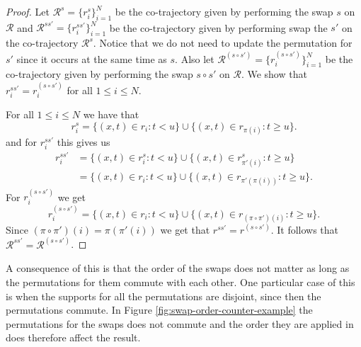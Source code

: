 \documentclass[12pt]{article}
\newcommand{\traj}{r}
\newcommand{\cotraj}{\mathcal{R}}
\newcommand{\swap}{s}
\theoremstyle{definition}
\begin{document}
\begin{proof}
  Let \(\cotraj^{\swap} = \{\traj^{\swap}_{i}\}_{i = 1}^{N}\) be the
  co-trajectory given by performing the swap \(\swap\) on \(\cotraj\)
  and
  \(\cotraj^{\swap\swap'} = \{\traj^{\swap\swap'}_{i}\}_{i = 1}^{N}\)
  be the co-trajectory given by performing swap the \(\swap'\) on the
  co-trajectory \(\cotraj^{\swap}\). Notice that we do not need to
  update the permutation for \(\swap'\) since it occurs at the same
  time as \(\swap\). Also let
  \(\cotraj^{(\swap \circ \swap')} = \{\traj^{(\swap \circ
    \swap')}_{i}\}_{i = 1}^{N}\) be the co-trajectory given by
  performing the swap \(\swap \circ \swap'\) on \(\cotraj\). We show
  that \(\traj^{\swap\swap'}_{i} = \traj^{(\swap \circ \swap')}_{i}\)
  for all \(1 \leq i \leq N\).

  For all \(1 \leq i \leq N\) we have that
  \begin{equation*}
    \traj^{\swap}_{i} = \{(x, t) \in \traj_{i}: t < u\}
    \cup \{(x, t) \in \traj_{\pi(i)}: t \geq u\}.
  \end{equation*}
  and for \(\traj^{\swap\swap'}_{i}\) this gives us
  \begin{align*}
    \traj^{\swap\swap'}_{i} & = \{(x, t) \in \traj^{\swap}_{i}: t < u\}
                              \cup \{(x, t) \in \traj^{\swap}_{\pi'(i)}: t \geq u\}\\
                            & = \{(x, t) \in \traj_{i}: t < u\}
                              \cup \{(x, t) \in \traj_{\pi'(\pi(i))}: t \geq u\}.
  \end{align*}
  For \(\traj^{(\swap \circ \swap')}_{i}\) we get
  \begin{equation*}
    \traj^{(\swap \circ \swap')}_{i} = \{(x, t) \in \traj_{i}: t < u\}
    \cup \{(x, t) \in \traj_{(\pi \circ \pi')(i)}: t \geq u\}.
  \end{equation*}
  Since \((\pi \circ \pi')(i) = \pi(\pi'(i))\) we get that
  \(\traj^{\swap\swap'} = \traj^{{(\swap \circ \swap')}}\). It follows
  that \(\cotraj^{\swap\swap'} = \cotraj^{(\swap \circ \swap')}\).
\end{proof}

A consequence of this is that the order of the swaps does not matter
as long as the permutations for them commute with each other. One
particular case of this is when the supports for all the permutations
are disjoint, since then the permutations commute. In Figure
\ref{fig:swap-order-counter-example} the permutations for the swaps
does not commute and the order they are applied in does therefore
affect the result.
\end{document}
